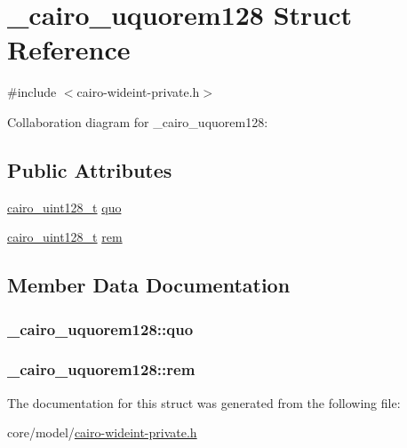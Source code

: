 \hypertarget{struct__cairo__uquorem128}{}\section{\+\_\+cairo\+\_\+uquorem128 Struct Reference}
\label{struct__cairo__uquorem128}


{\ttfamily \#include $<$cairo-\/wideint-\/private.\+h$>$}



Collaboration diagram for \+\_\+cairo\+\_\+uquorem128\+:
\subsection*{Public Attributes}
\begin{DoxyCompactItemize}
\item 
\hyperlink{cairo-wideint-private_8h_ab99b9c539c5f08b381ec3797b3fcd872}{cairo\+\_\+uint128\+\_\+t} \hyperlink{struct__cairo__uquorem128_aaa67cc24ac0c9ad1fb97f732187a0ab2}{quo}
\item 
\hyperlink{cairo-wideint-private_8h_ab99b9c539c5f08b381ec3797b3fcd872}{cairo\+\_\+uint128\+\_\+t} \hyperlink{struct__cairo__uquorem128_a7a964e22b58920045458c6a528791cbc}{rem}
\end{DoxyCompactItemize}


\subsection{Member Data Documentation}
\subsubsection[{\texorpdfstring{quo}{quo}}]{ \+\_\+cairo\+\_\+uquorem128\+::quo}\hypertarget{struct__cairo__uquorem128_aaa67cc24ac0c9ad1fb97f732187a0ab2}{}\label{struct__cairo__uquorem128_aaa67cc24ac0c9ad1fb97f732187a0ab2}
\subsubsection[{\texorpdfstring{rem}{rem}}]{ \+\_\+cairo\+\_\+uquorem128\+::rem}\hypertarget{struct__cairo__uquorem128_a7a964e22b58920045458c6a528791cbc}{}\label{struct__cairo__uquorem128_a7a964e22b58920045458c6a528791cbc}


The documentation for this struct was generated from the following file\+:\begin{DoxyCompactItemize}
\item 
core/model/\hyperlink{cairo-wideint-private_8h}{cairo-\/wideint-\/private.\+h}\end{DoxyCompactItemize}
